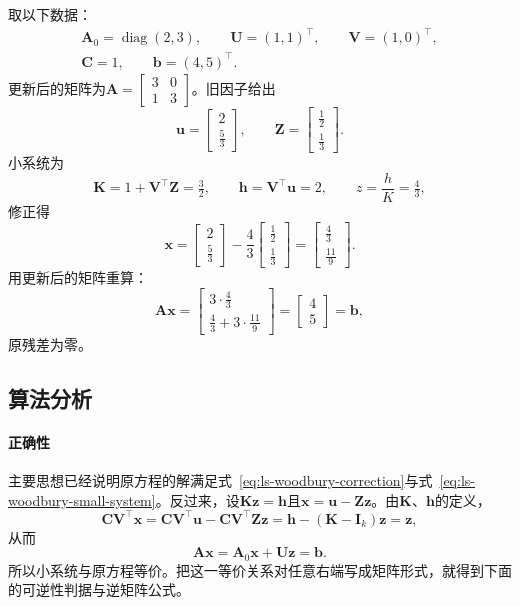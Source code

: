 \begin{example}[非对称的秩一更新]
\label{ex:ls-woodbury-nonsymmetric}
取以下数据：
\[
 \begin{gathered}
 \bm A_0=\operatorname{diag}(2,3),\qquad \bm U=(1,1)^\top,\qquad \bm V=(1,0)^\top,\\
 \bm C=1,\qquad \bm b=(4,5)^\top .
 \end{gathered}
\]
更新后的矩阵为$\bm A=\left[\begin{smallmatrix}3&0\\1&3\end{smallmatrix}\right]$。旧因子给出
\[
 \bm u=\begin{bmatrix}2\\\tfrac53\end{bmatrix},\qquad
 \bm Z=\begin{bmatrix}\tfrac12\\\tfrac13\end{bmatrix}.
\]
小系统为
\[
 \bm K=1+\bm V^\top\bm Z=\tfrac32,\qquad
 \bm h=\bm V^\top\bm u=2,\qquad
 z=\frac{h}{K}=\tfrac43 ,
\]
修正得
\[
 \bm x=\begin{bmatrix}2\\\tfrac53\end{bmatrix}-\frac43\begin{bmatrix}\tfrac12\\\tfrac13\end{bmatrix}
 =\begin{bmatrix}\tfrac43\\\tfrac{11}9\end{bmatrix}.
\]
用更新后的矩阵重算：
\[
 \bm A\bm x=\begin{bmatrix}3\cdot\tfrac43\\\tfrac43+3\cdot\tfrac{11}9\end{bmatrix}=\begin{bmatrix}4\\5\end{bmatrix}=\bm b,
\]
原残差为零。
\end{example}

\subsection{算法分析}
\paragraph{正确性}
主要思想已经说明原方程的解满足式~\eqref{eq:ls-woodbury-correction}与式~\eqref{eq:ls-woodbury-small-system}。反过来，设$\bm K\bm z=\bm h$且$\bm x=\bm u-\bm Z\bm z$。由$\bm K$、$\bm h$的定义，
\[
 \bm C\bm V^\top\bm x=\bm C\bm V^\top\bm u-\bm C\bm V^\top\bm Z\bm z=\bm h-(\bm K-\bm I_k)\bm z=\bm z ,
\]
从而
\[
 \bm A\bm x=\bm A_0\bm x+\bm U\bm z=\bm b .
\]
所以小系统与原方程等价。把这一等价关系对任意右端写成矩阵形式，就得到下面的可逆性判据与逆矩阵公式。

